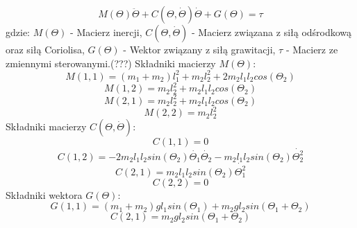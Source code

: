 \documentclass[fleqn,10pt]{physiome}
\begin{document}
\begin{equation}
    M(\Theta) \ddot{\Theta} + C(\Theta,\dot{\Theta}) \dot{\Theta} + G(\Theta) = \tau
\end{equation}
gdzie:
\newline
 $M(\Theta)$ - Macierz inercji,\newline
 $C(\Theta,\dot{\Theta})$ - Macierz związana z siłą odśrodkową oraz siłą Coriolisa,\newline
 $G(\Theta)$ - Wektor związany z siłą grawitacji,\newline
 $\tau$ - Macierz ze zmiennymi sterowanymi.(???)\newline
 \newline
 Składniki macierzy $M(\Theta)$:\newline
 \begin{equation}
     M(1,1)=(m_1+m_2) l_{1}^{2}+m_2l_{2}^{2}+2m_2l_1l_2cos(\Theta_2)
 \end{equation}
 \begin{equation}
     M(1,2)=m_2 l_{2}^{2}+m_2l_1l_2cos(\Theta_2)
 \end{equation}
 \begin{equation}
     M(2,1)=m_2 l_{2}^{2}+m_2l_1l_2cos(\Theta_2)
 \end{equation}
 \begin{equation}
     M(2,2)=m_2 l_{2}^{2}
 \end{equation}
 \newline
 Składniki macierzy $C(\Theta,\dot{\Theta})$:
 \newline
  \begin{equation}
     C(1,1)=0
 \end{equation}
 \begin{equation}
     C(1,2)=-2m_2l_1l_2sin(\Theta_2)\dot{\Theta_1}\dot{\Theta_2}-m_2l_1l_2sin(\Theta_2)\dot{\Theta_{2}^{2}}   
 \end{equation}
 \begin{equation}
     C(2,1)=m_2l_1l_2sin(\Theta_2)\dot{\Theta_{1}^{2}}
 \end{equation}
 \begin{equation}
     C(2,2)=0
 \end{equation}
  \newline
 Składniki wektora $G(\Theta)$:
\newline
\begin{equation}
     G(1,1)=(m_1+m_2)gl_1sin(\Theta_1)+m_2gl_2sin(\Theta_1+\Theta_2)
\end{equation}
\begin{equation}
     C(2,1)=m_2gl_2sin(\Theta_1+\Theta_2)
\end{equation}
\newline
\end{document}
